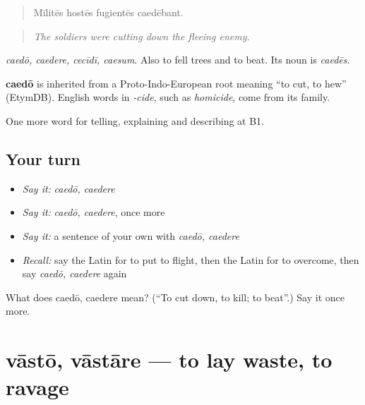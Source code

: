 \begin{quote}
Mīlitēs hostēs fugientēs caedēbant.
\end{quote}

\begin{quote}
\emph{The soldiers were cutting down the fleeing enemy.}
\end{quote}

\emph{caedō, caedere, cecīdī, caesum}. Also to fell trees and to beat. Its noun is \emph{caedēs}.

\begin{cousinweb}
\textbf{caedō} is inherited from a Proto-Indo-European root meaning \textquotedblleft{}to cut, to hew\textquotedblright{} (EtymDB). English words in \emph{-cide}, such as \emph{homicide}, come from its family.
\end{cousinweb}

\begin{grammarlens}[title={What you've built}]
One more word for telling, explaining and describing at B1.
\end{grammarlens}

\subsection*{Your turn}
\begin{itemize}
\raggedright
  \item \emph{Say it:} \emph{caedō, caedere}
  \item \emph{Say it:} \emph{caedō, caedere}, once more
  \item \emph{Say it:} a sentence of your own with \emph{caedō, caedere}
  \item \emph{Recall:} say the Latin for to put to flight, then the Latin for to overcome, then say \emph{caedō, caedere} again
\end{itemize}

\begin{tcolorbox}[breakable,colback=teal!4,colframe=teal!35!black,title={Before you move on}]
What does caedō, caedere mean? (\textquotedblleft{}To cut down, to kill; to beat\textquotedblright{}.) Say it once more.
\end{tcolorbox}
\section[vāstō, vāstāre]{vāstō, vāstāre — to lay waste, to ravage}

\label{lesson:LA-C342-vasto}



